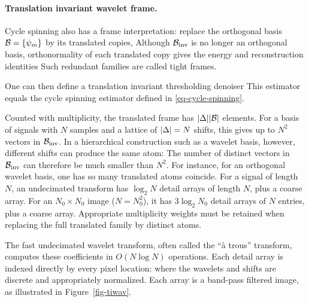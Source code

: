 
\paragraph{Translation invariant wavelet frame.}

Cycle spinning also has a frame interpretation: replace the orthogonal basis $\mathcal{B} = \{\psi_m\}$ by its translated copies,
Although $\mathcal{B}_{\text{inv}}$ is no longer an orthogonal basis, orthonormality of each translated copy gives the energy and reconstruction identities
Such redundant families are called tight frames.

One can then define a translation invariant thresholding denoiser
This estimator equals the cycle spinning estimator defined in \eqref{eq-cycle-spinning}.

Counted with multiplicity, the translated frame has $|\Delta| |\mathcal{B}|$ elements.
For a basis of signals with $N$ samples and a lattice of $|\Delta|=N$ shifts, this gives up to $N^2$ vectors in $\mathcal{B}_{\text{inv}}$. In a hierarchical construction such as a wavelet basis, however, different shifts can produce the same atom:
The number of distinct vectors in $\mathcal{B}_{\text{inv}}$ can therefore be much smaller than $N^2$.
For instance, for an orthogonal wavelet basis, one has
so many translated atoms coincide. For a signal of length $N$, an undecimated transform has $\log_2N$ detail arrays of length $N$, plus a coarse array. For an $N_0\times N_0$ image ($N=N_0^2$), it has $3\log_2N_0$ detail arrays of $N$ entries, plus a coarse array. Appropriate multiplicity weights must be retained when replacing the full translated family by distinct atoms.

The fast undecimated wavelet transform, often called the ``\`a trous'' transform, computes these coefficients in $O(N\log N)$ operations. Each detail array is indexed directly by every pixel location:
where the wavelets and shifts are discrete and appropriately normalized. Each array is a band-pass filtered image, as illustrated in Figure~\ref{fig-tiwav}.

